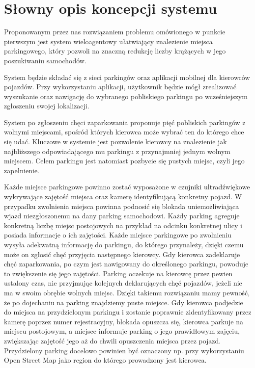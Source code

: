 \newpage
\section{Słowny opis koncepcji systemu}

Proponowanym przez nas rozwiązaniem problemu omówionego w punkcie pierwszym jest system wieloagentowy ułatwiający znalezienie miejsca parkingowego, który pozwoli na znaczną redukcję liczby krążących w jego poszukiwaniu samochodów.

System będzie składać się z sieci parkingów oraz aplikacji mobilnej dla kierowców pojazdów. Przy wykorzystaniu aplikacji, użytkownik będzie mógł zrealizować wyszukanie oraz nawigację do wybranego pobliskiego parkingu po wcześniejszym zgłoszeniu swojej lokalizacji.

System po zgłoszeniu chęci zaparkowania proponuje pięć pobliskich parkingów z wolnymi miejscami, spośród których kierowca może wybrać ten do którego chce się udać. Kluczowe w systemie jest pozwolenie kierowcy na znalezienie jak najbliższego odpowiadającego mu parkingu z przynajmniej jednym wolnym miejscem. Celem parkingu jest natomiast pozbycie się pustych miejsc, czyli jego zapełnienie.

Każde miejsce parkingowe powinno zostać wyposażone w czujniki ultradźwiękowe wykrywające zajętość miejsca oraz kamerę identyfikującą konkretny pojazd. W przypadku zwolnienia miejsca powinna podnosić się blokada uniemożliwiająca wjazd niezgłoszonemu  na dany parking samochodowi. Każdy parking agreguje konkretną liczbę miejsc postojowych na przykład na odcinku konkretnej ulicy i posiada informacje o ich zajętości. Każde miejsce parkingowe po zwolnieniu wysyła adekwatną informację do parkingu, do którego przynależy, dzięki czemu może on zgłosić chęć przyjęcia następnego kierowcy. Gdy kierowca zadeklaruje chęć zaparkowania, po czym jest nawigowany do określonego parkingu, powoduje to zwiększenie się jego zajętości. Parking oczekuje na kierowcę przez pewien ustalony czas, nie przyjmując kolejnych deklarujących chęć pojazdów, jeżeli nie ma w swoim obrębie wolnych miejsc. Dzięki takiemu rozwiązaniu mamy pewność, że po dojechaniu na parking znajdziemy puste miejsce. Gdy kierowca podjedzie do miejsca na przydzielonym parkingu i zostanie poprawnie zidentyfikowany przez kamerę poprzez numer rejestracyjny, blokada opuszcza się, kierowca parkuje na miejscu postojowym, a miejsce informuje parking o jego prawidłowym zajęciu, zwiększając zajętość jego aż do chwili opuszczenia miejsca przez pojazd. Przydzielony parking docelowo powinien być oznaczony np. przy wykorzystaniu Open Street Map jako region do którego prowadzony jest kierowca. 

